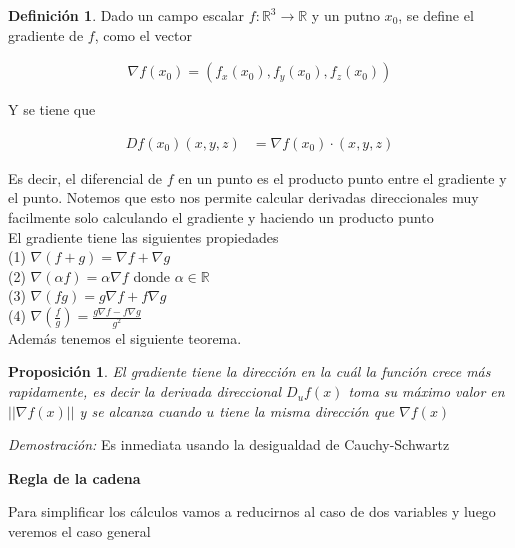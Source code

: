 \documentclass{article}
\theoremstyle{plain}
\newtheorem{prop}[thm]{Proposición}
\theoremstyle{definition}
\newtheorem{defin}[thm]{Definición}
\begin{document}
\begin{defin}Dado un campo escalar $f: \mathbb{R}^3 \to \mathbb{R}$ y un putno $x_0$, se define el gradiente de $f$, como el vector
\end{defin}

\begin{align*}
    \nabla f (x_0)= (f_x(x_0),f_y(x_0),f_z(x_0))
\end{align*}

Y se tiene que

\begin{align*}
    Df(x_0)(x,y,z) &=  \nabla f (x_0) \cdot (x,y,z)
\end{align*}

Es decir, el diferencial de $f$ en un punto  es el producto punto entre el gradiente y el punto. Notemos que esto nos permite calcular derivadas direccionales muy facilmente solo calculando el gradiente y haciendo un producto punto\\

El gradiente tiene las siguientes propiedades \\

(1) $\nabla (f+g) = \nabla f +\nabla g$ \\
(2) $\nabla (\alpha f) = \alpha \nabla f$ donde $\alpha \in \mathbb{R}$ \\
(3) $\displaystyle \nabla (fg) = g\nabla f + f \nabla g$ \\
(4) $\displaystyle \nabla \left( \frac{f}{g}\right) = \frac{g \nabla f- f \nabla g}{g^2}$ \\


Además tenemos el siguiente teorema. \\


\begin{prop}El gradiente tiene la dirección en la cuál la función crece más rapidamente, es decir la derivada direccional $D_u f(x)$ toma su máximo valor en $|| \nabla f(x)||$ y se alcanza cuando $u$ tiene la misma dirección que $\nabla f(x)$\\
\end{prop}

\textit{Demostración:} Es inmediata usando la desigualdad de Cauchy-Schwartz

\newpage


\begin{center}
    \Large{\textbf{Regla de la cadena}}
\end{center}

Para simplificar los cálculos vamos a reducirnos al caso de dos variables y luego veremos el caso general \\
\end{document}
